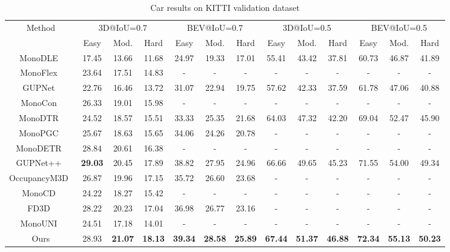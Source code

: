 \documentclass[journal]{IEEEtran}
\begin{document}
	\begin{table}[h]
		\centering
		\caption{{Car results on KITTI validation dataset}}
		\label{tab:kitti_valid}

			{%
				\begin{tabular}{ccccccccccccc}
					\toprule%
					\multirow{2}{*}{{Method}} & \multicolumn{3}{c}{{3D@IoU=0.7}} & \multicolumn{3}{c}{{BEV@IoU=0.7}}  & \multicolumn{3}{c}{{3D@IoU=0.5}} & \multicolumn{3}{c}{{BEV@IoU=0.5}}\\ \cmidrule{2-13}
					& {Easy}           & {Mod.}           & {Hard}   & {Easy}           & {Mod.}           & {Hard} & {Easy}           & {Mod.}           & {Hard} & {Easy}           & {Mod.}           & {Hard}                        \\ 
					\midrule%
					{MonoDLE~\cite{monodle}}			& {17.45}	& {13.66}	& {11.68}	& 24.97 & 19.33 & 17.01 & 55.41 & 43.42 & 37.81 & 60.73 & 46.87 & 41.89 	\\
					{MonoFlex~\cite{monoflex}}			& {23.64}	& {17.51}   & {14.83}  & - & - & - & - & - & - & - & - & -  	\\
					{GUPNet~\cite{gupnet}}            	& {22.76}   & {16.46}   & {13.72}  & 31.07 & 22.94 & 19.75 & 57.62 & 42.33 & 37.59 & 61.78 & 47.06 & 40.88 	\\
					{MonoCon~\cite{monocon}}         	& {26.33}   & {19.01}   & {15.98}  & - & - & - & - & - & - & - & - & -  	\\
					{MonoDTR~\cite{monodtr}}         	& {24.52}   & {18.57}   & {15.51}  & 33.33 & 25.35 & 21.68 & 64.03 & 47.32 & 42.20 & 69.04 & 52.47 & 45.90 	\\
					{MonoPGC~\cite{monopgc}}         	& {25.67}   & {18.63}   & {15.65}  & 34.06 & 24.26 & 20.78 & - & - & - & - & - & -  	\\
					{MonoDETR~\cite{monodetr}} & 28.84 & 20.61 & 16.38 & - & - & - & - & - & - & - & - & -  	\\
					
					{GUPNet++~\cite{gupnet++}}         	& \textbf{29.03}   & {20.45}   & {17.89}  & 38.82 & 27.95 & 24.96 & 66.66 & 49.65 & 45.23 & 71.55 & 54.00 & 49.34 	\\
					{OccupancyM3D~\cite{occupancym3d}}         	& {26.87}   & {19.96}   & {17.15}  & 35.72 & 26.60 & 23.68 & - & - & - & - & - & - 	\\
					{MonoCD~\cite{monocd}}         	& {24.22}   & {18.27}   & {15.42}  & - & - & - & - & - & - & - & - & - 	\\
					{FD3D~\cite{fd3d}}         	& {28.22}   & {20.23}   & {17.04}  & 36.98 & 26.77 & 23.16 & - & - & - & - & - & - 	\\
					{MonoUNI~\cite{monouni}}         	& {24.51}   & {17.18}   & {14.01}  & - & - & - & - & - & - & - & - & - 	\\
					{Ours}         						& {28.93} 		& \textbf{21.07} 		& \textbf{18.13} & \textbf{39.34} 	& \textbf{28.58} & \textbf{25.89} & \textbf{67.44} & \textbf{51.37} & \textbf{46.88} & \textbf{72.34} & \textbf{55.13} & \textbf{50.23}	   	\\ 
					\bottomrule%
				\end{tabular}
			}

	\end{table}
	
\end{document}
